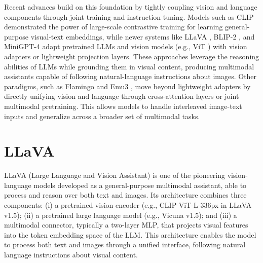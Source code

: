 Recent advances build on this foundation by tightly coupling vision and language components through joint training and instruction tuning. Models such as CLIP \cite{radfordLearningTransferableVisual2021} demonstrated the power of large-scale contrastive training for learning general-purpose visual-text embeddings, while newer systems like LLaVA \cite{liuVisualInstructionTuning2023, liuImprovedBaselinesVisual2024}, BLIP-2 \cite{liBLIP2BootstrappingLanguageImage2023}, and MiniGPT-4 \cite{zhuMiniGPT4EnhancingVisionLanguage2023} adapt pretrained LLMs and vision models (e.g., ViT \cite{dosovitskiyImageWorth16x162021}) with vision adapters or lightweight projection layers. These approaches leverage the reasoning abilities of LLMs while grounding them in visual content, producing multimodal assistants capable of following natural-language instructions about images. Other paradigms, such as Flamingo \cite{alayracFlamingoVisualLanguage2022} and Emu3 \cite{wangEmu3NextTokenPrediction2024}, move beyond lightweight adapters by directly unifying vision and language through cross-attention layers or joint multimodal pretraining. This allows models to handle interleaved image-text inputs and generalize across a broader set of multimodal tasks.

\section{LLaVA}\label{sec:llava}

LLaVA \cite{liuVisualInstructionTuning2023, liuImprovedBaselinesVisual2024} (Large Language and Vision Assistant) is one of the pioneering vision-language models developed as a general-purpose multimodal assistant, able to process and reason over both text and images. Its architecture combines three components: (i) a pretrained vision encoder (e.g., CLIP-ViT-L-336px in LLaVA v1.5); (ii) a pretrained large language model (e.g., Vicuna v1.5); and (iii) a multimodal connector, typically a two-layer MLP, that projects visual features into the token embedding space of the LLM. This architecture enables the model to process both text and images through a unified interface, following natural language instructions about visual content.


